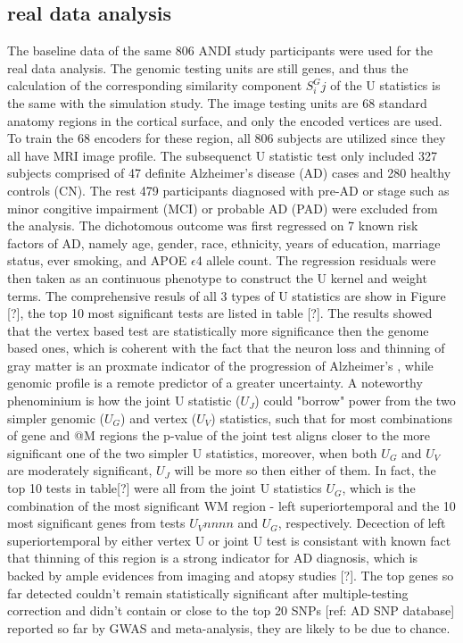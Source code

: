 \subsection{real data analysis}
The baseline data of the same 806 ANDI study participants were used for the real data analysis. The genomic testing units are still genes, and thus the calculation of the corresponding similarity component $S^G_ij$ of the U statistics is the same with the simulation study. The image testing units are 68 standard anatomy regions in the cortical surface, and only the encoded vertices are used. To train the 68 encoders for these region, all 806 subjects are utilized since they all have MRI image profile. The subsequenct U statistic test only included 327 subjects comprised of 47 definite Alzheimer's disease (AD) cases and 280 healthy controls (CN). The rest 479 participants diagnosed with pre-AD or stage such as minor congitive impairment (MCI) or probable AD (PAD) were excluded from the analysis. The dichotomous outcome was first regressed on 7 known risk factors of AD, namely age, gender, race, ethnicity, years of education, marriage status, ever smoking, and APOE $\epsilon$4 allele count. The regression residuals were then taken as an continuous phenotype to construct the U kernel and weight terms. The comprehensive resuls of all 3 types of U statistics are show in Figure [?], the top 10 most significant tests are listed in table [?]. 
The results showed that the vertex based test are statistically more significance then the genome based ones, which is coherent with the fact that the neuron loss and thinning of gray matter is an proxmate indicator of the progression of Alzheimer's , while genomic profile is a remote predictor of a greater uncertainty. A noteworthy phenominium is how the joint U statistic ($U_J$) could "borrow" power from the two simpler genomic ($U_G$) and vertex ($U_V$) statistics, such that for most combinations of gene and @M regions the p-value of the joint test aligns closer to the more significant one of the two simpler U statistics, moreover, when both $U_G$ and $U_V$ are moderately significant, $U_J$ will be more so then either of them. In fact, the top 10 tests in table[?] were all from the joint U statistics $U_G$, which is the combination of the most significant WM region - left superiortemporal and the 10 most significant genes from tests $U_Vnnnn$ and $U_G$, respectively. Decection of left superiortemporal by either vertex U or joint U test is consistant with known fact that thinning of this region is a strong indicator for AD diagnosis, which is backed by ample evidences from imaging and atopsy studies [?]. The top genes so far detected couldn't remain statistically significant after multiple-testing correction and didn't contain or close to the top 20 SNPs [ref: AD SNP database] reported so far by GWAS and meta-analysis, they are likely to be due to chance. 




